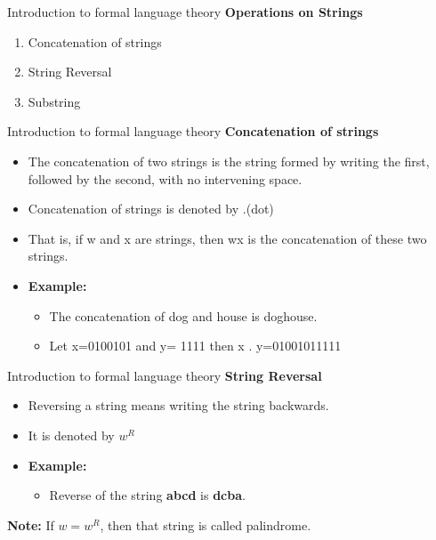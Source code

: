 \documentclass{beamer}
\begin{document}
\begin{frame}{Introduction to formal language theory}
	\textbf{Operations on Strings}
	\begin{enumerate}
		\item Concatenation of strings
		\item String Reversal
		\item Substring
	\end{enumerate}
\end{frame}
\begin{frame}{Introduction to formal language theory}
	\textbf{Concatenation of strings}
	\begin{itemize}
		\item The concatenation of two strings is the string formed by writing the first, 
		followed by the second, with no intervening space.
		\item Concatenation of strings is denoted by .(dot)
		\item That is, if w and x are strings, then wx is the concatenation of these two 
		strings.
		\item \textbf{Example:}
			\begin{itemize}
				\item The concatenation of dog and house is doghouse. 
				\item Let x=0100101 and y= 1111 then x . y=01001011111

			\end{itemize}
	\end{itemize}
\end{frame}
\begin{frame}{Introduction to formal language theory}
	\textbf{String Reversal}
	\begin{itemize}
		\item Reversing a string means writing the string backwards.
		\item It is denoted by $w^R$
		\item \textbf{Example:}
		\begin{itemize}
			\item Reverse of the string \textbf{abcd} is \textbf{dcba}.
		\end{itemize}
	\end{itemize}
\textbf{Note:} If $w=w^R$, then that string is called palindrome.
\end{frame}
\end{document}
